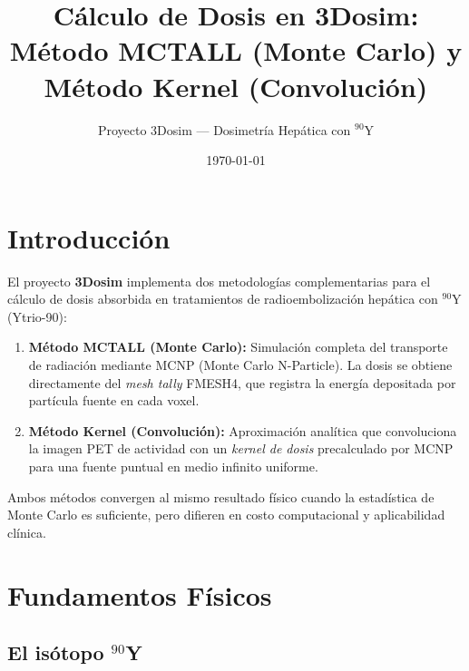 \documentclass[12pt,a4paper]{article}
\title{\textbf{Cálculo de Dosis en 3Dosim:} \\
       Método MCTALL (Monte Carlo) y \\
       Método Kernel (Convolución)}
\author{Proyecto 3Dosim — Dosimetría Hepática con $^{90}$Y}
\date{\today}
\begin{document}
\maketitle
\thispagestyle{empty}
\newpage

\tableofcontents
\newpage

\section{Introducción}

El proyecto \textbf{3Dosim} implementa dos metodologías complementarias para el
cálculo de dosis absorbida en tratamientos de radioembolización hepática con
$^{90}$Y (Ytrio-90):

\begin{enumerate}
    \item \textbf{Método MCTALL (Monte Carlo):} Simulación completa del
        transporte de radiación mediante MCNP (Monte Carlo N-Particle). La
        dosis se obtiene directamente del \emph{mesh tally} FMESH4, que
        registra la energía depositada por partícula fuente en cada voxel.
    \item \textbf{Método Kernel (Convolución):} Aproximación analítica que
        convoluciona la imagen PET de actividad con un \emph{kernel de dosis}
        precalculado por MCNP para una fuente puntual en medio infinito
        uniforme.
\end{enumerate}

Ambos métodos convergen al mismo resultado físico cuando la estadística de
Monte Carlo es suficiente, pero difieren en costo computacional y
aplicabilidad clínica.

\section{Fundamentos Físicos}

\subsection{El isótopo $^{90}$Y}
\end{document}
